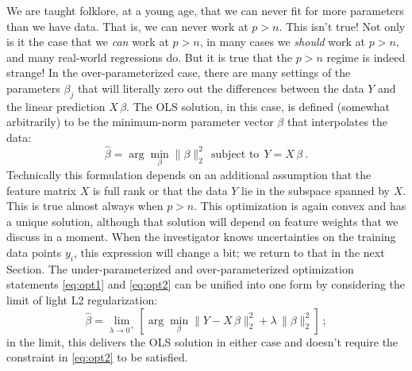 \documentclass[12pt,letterpaper]{article}
\newcommand{\sectionname}{Section}
\begin{document}
We are taught folklore, at a young age, that we can never fit for more parameters than we have data. That is, we can never work at $p>n$.
This isn't true!
Not only is it the case that we \emph{can} work at $p>n$, in many cases we \emph{should} work at $p>n$, and many real-world regressions do.
But it is true that the $p>n$ regime is indeed strange!
In the over-parameterized case, there are many settings of the parameters $\beta_j$ that will literally zero out the differences between the data $Y$ and the linear prediction $X\,\beta$.
The OLS solution, in this case, is defined (somewhat arbitrarily) to be the minimum-norm parameter vector $\beta$ that interpolates the data:
\begin{equation}\label{eq:opt2}
    \hat{\beta} = \arg\min_\beta \|\beta\|_2^2 ~~\mbox{subject to}~~ Y = X\,\beta
    ~.
\end{equation}
Technically this formulation depends on an additional assumption that the feature matrix $X$ is full rank or that the data $Y$ lie in the subspace spanned by $X$.
This is true almost always when $p>n$.
This optimization is again convex and has a unique solution, although that solution will depend on feature weights that we discuss in a moment.
When the investigator knows uncertainties on the training data points $y_i$, this expression will change a bit; we return to that in the next \sectionname.
The under-parameterized and over-parameterized optimization statements \eqref{eq:opt1} and \eqref{eq:opt2} can be unified into one form by considering the limit of light L2 regularization:
\begin{equation}\label{eq:opt3}
    \hat{\beta} = \lim_{\lambda\rightarrow 0^+}\left[\arg\min_\beta \|Y - X\,\beta\|_2^2 + \lambda\,\|\beta\|_2^2\right]
    ~;
\end{equation}
in the limit, this delivers the OLS solution in either case and doesn't require the constraint in \eqref{eq:opt2} to be satisfied.
\end{document}
